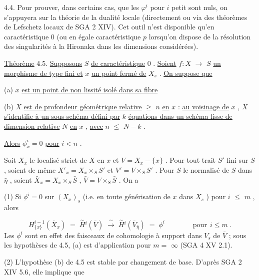 4.4.  Pour prouver, dans certains cas, que les  $\varphi^i$  pour  $i$  petit sont nuls, on s'appuyera sur la théorie de la dualité locale (directement ou via des théorèmes de Lefschetz locaux de SGA 2 XIV). Cet outil n'est disponible qu'en caractéristique 0 (ou en égale caractéristique  $p$ lorsqu'on dispose de la résolution des singularités à la Hironaka dans les dimensions considérées).



\underline{Théorème} 4.5.  \underline{Supposons}  $S$  \underline{de caractéristique} 0 . \underline{Soient}  $f : X$ $\longrightarrow$ $S$  \underline{un morphisme de type fini et}  $x$  \underline{un point fermé de}  $X_s$ . \underline{On suppose que}

(a) $x$  \underline{est un point de non lissité isolé dans sa fibre}

(b) $X$  \underline{est de profondeur géométrique relative} $\geqslant$ $n$ \underline{en}  $x$ : \underline{au voisinage de} $x$ , $X$ \underline{s'identifie à un sous-schéma défini par} $k$ \underline{équations dans un schéma lisse de dimension relative} $N$ \underline{en} $x$ , \underline{avec}  $n$ $\leqslant$ $N-k$ .

\underline{Alors}  $\phi^i_x = 0$  \underline{pour}  $i < n$ .

Soit  $X_x$  le localisé strict de  $X$  en  $x$  et  $V = X_x - \{x\}$  . Pour tout trait  $S'$  fini sur  $S$ , soient de même  $X'_x = X_x \times_S S'$  et  $V' = V \times_S S'$ . Pour  $S$  le normalisé de  $S$  dans  $\bar{\eta}$ , soient  $\bar{X}_x = X_x \times_S \bar{S}$ ,  $\bar{V} = V \times_S \bar{S}$ . On a

(1) Si $\phi^i = 0$  sur  $(X_x)_s$  (i.e. en toute générisation de  $x$  dans  $X_s$ ) pour $i$ $\leqslant$ $m$ , alors

\begin{equation*}
H^{i-1}_{\{x\}}(\bar{X}_x) \;=\; \overset{\sim}{H}{}^{i}(\bar{V}) \;\xrightarrow{\ \sim\ }\; \overset{\sim}{H}{}^{i}(\bar{V}_{\bar{\eta}}) \;=\; \phi^i \qquad\qquad \text{pour}\ \ i \leqslant m\ .
\end{equation*}
Les  $\phi^i$  sont en effet des faisceaux de cohomologie à support dans  $V_s$  de  $\bar{V}$ ; sous les hypothèses de 4.5, (a) est d'application pour  $m =$ $\infty$   (SGA 4 XV 2.1).

(2) L'hypothèse (b) de 4.5 est stable par changement de base. D'après SGA 2 XIV 5.6, elle implique que

